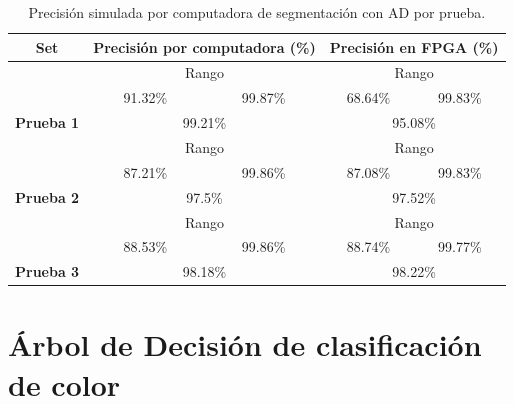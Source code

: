 \documentclass[twoside,spanish,ESP,MSc]{plantillaLabUPV}
\theoremstyle{definition}
\begin{document}
\begin{table}[h]
	\caption{Precisión simulada por computadora de segmentación con AD por prueba.}
	\label{acurasgm}
	\centering
	\begin{tabular}{|c|c|c|c|c|}
		\hline
		\textbf{Set}                        & \multicolumn{2}{c|}{\textbf{Precisión por computadora (\%)}} & \multicolumn{2}{c|}{\textbf{Precisión en FPGA (\%)}} \\ \hline
		& \multicolumn{2}{c|}{{\color[HTML]{000000} Rango}}            & \multicolumn{2}{c|}{{\color[HTML]{000000} Rango}}    \\ \cline{2-5} 
		& 91.32\%                       & 99.87\%                      & 68.64\%                       & 99.83\%                      \\ \cline{2-5} 
		\multirow{-3}{*}{\textbf{Prueba 1}} & \multicolumn{2}{c|}{99.21\%}                                 & \multicolumn{2}{c|}{95.08\%}                             \\ \hline
		& \multicolumn{2}{c|}{{\color[HTML]{000000} Rango}}            & \multicolumn{2}{c|}{{\color[HTML]{000000} Rango}}    \\ \cline{2-5}
		& 87.21\%                           & 99.86\%                          & 87.08\%                       & 99.83\%                      \\ \cline{2-5} 
		\multirow{-3}{*}{\textbf{Prueba 2}} & \multicolumn{2}{c|}{97.5\%}                                     & \multicolumn{2}{c|}{97.52\%}                             \\ \hline
		& \multicolumn{2}{c|}{{\color[HTML]{000000} Rango}}            & \multicolumn{2}{c|}{{\color[HTML]{000000} Rango}}    \\ \cline{2-5} 
		& 88.53\%                           & 99.86\%                          & 88.74\%                       & 99.77\%                      \\ \cline{2-5} 
		\multirow{-3}{*}{\textbf{Prueba 3}} & \multicolumn{2}{c|}{98.18\%}                                     & \multicolumn{2}{c|}{98.22\%}                             \\ \hline
	\end{tabular}
\end{table}



\section{Árbol de Decisión de clasificación de color}
\end{document}
